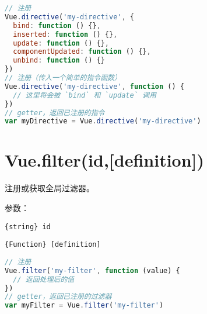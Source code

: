 \begin{lstlisting}[language=JavaScript]
// 注册
Vue.directive('my-directive', {
  bind: function () {},
  inserted: function () {},
  update: function () {},
  componentUpdated: function () {},
  unbind: function () {}
})
// 注册（传入一个简单的指令函数）
Vue.directive('my-directive', function () {
  // 这里将会被 `bind` 和 `update` 调用
})
// getter，返回已注册的指令
var myDirective = Vue.directive('my-directive')
\end{lstlisting}

\section{Vue.filter(id,[definition])}

注册或获取全局过滤器。

参数：

\begin{compactitem}
\item \texttt{\{string\} id}
\item \texttt{\{Function\} [definition]}
\end{compactitem}



\begin{lstlisting}[language=JavaScript]
// 注册
Vue.filter('my-filter', function (value) {
  // 返回处理后的值
})
// getter，返回已注册的过滤器
var myFilter = Vue.filter('my-filter')
\end{lstlisting}



\begin{lstlisting}[language=JavaScript]

\end{lstlisting}




\begin{lstlisting}[language=JavaScript]

\end{lstlisting}



\begin{lstlisting}[language=JavaScript]

\end{lstlisting}



\begin{lstlisting}[language=JavaScript]

\end{lstlisting}




